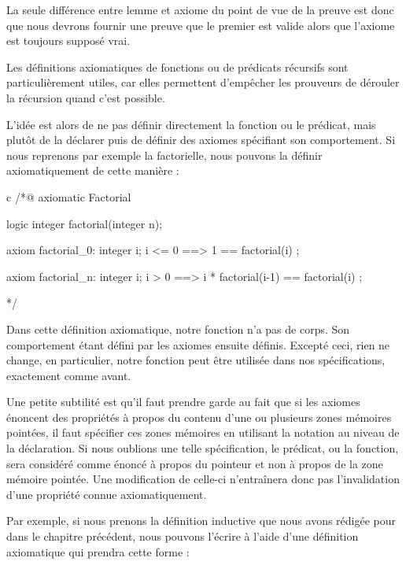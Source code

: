 La seule différence entre lemme et axiome du point de vue de la preuve est donc
que nous devrons fournir une preuve que le premier est valide alors que l'axiome
est toujours supposé vrai.





Les définitions axiomatiques de fonctions ou de prédicats récursifs sont
particulièrement utiles, car elles permettent d'empêcher les prouveurs de
dérouler la récursion quand c'est possible.



L'idée est alors de ne pas définir directement la fonction ou le prédicat, mais
plutôt de la déclarer puis de définir des axiomes spécifiant son comportement.
Si nous reprenons par exemple la factorielle, nous pouvons la définir
axiomatiquement de cette manière :



\begin{CodeBlock}{c}
/*@
  axiomatic Factorial{
    logic integer factorial(integer n);

    axiom factorial_0:
      \forall integer i; i <= 0 ==> 1 == factorial(i) ;

    axiom factorial_n:
      \forall integer i; i > 0 ==> i * factorial(i-1) == factorial(i) ;
  }
*/
\end{CodeBlock}



Dans cette définition axiomatique, notre fonction n'a pas de corps. Son
comportement étant défini par les axiomes ensuite définis. Excepté ceci,
rien ne change, en particulier, notre fonction peut être utilisée dans nos
spécifications, exactement comme avant.


Une petite subtilité
est qu'il faut prendre garde au fait que si les axiomes énoncent des propriétés
à propos du contenu d'une ou plusieurs zones mémoires pointées, il faut
spécifier ces zones mémoires en utilisant la notation  au niveau de
la déclaration. Si nous oublions une telle spécification, le prédicat, ou la
fonction, sera considéré comme énoncé à propos du pointeur et non à propos de la
zone mémoire pointée. Une modification de celle-ci n'entraînera donc pas
l'invalidation d'une propriété connue axiomatiquement.


Par exemple, si nous prenons la définition inductive que nous avons rédigée pour
 dans le chapitre précédent, nous pouvons l'écrire à l'aide
d'une définition axiomatique qui prendra cette forme :



